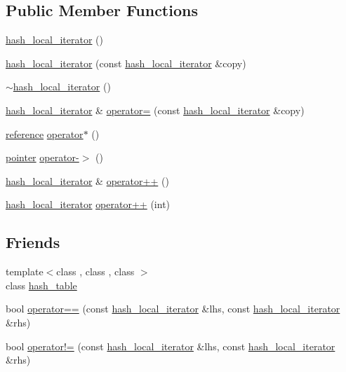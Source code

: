 \subsection*{Public Member Functions}
\begin{DoxyCompactItemize}
\item 
\hyperlink{classhash__const__local__iterator_a4f696dbd652463eff2a0694426810ffc}{hash\+\_\+local\+\_\+iterator} ()
\item 
\hyperlink{classhash__const__local__iterator_aa25e7f6e7190512c5e3ea83efb3f6c13}{hash\+\_\+local\+\_\+iterator} (const \hyperlink{classhash__local__iterator}{hash\+\_\+local\+\_\+iterator} \&copy)
\item 
\hyperlink{classhash__const__local__iterator_aaaa2de24d964d60ced25f38b52f594cd}{$\sim$hash\+\_\+local\+\_\+iterator} ()
\item 
\hyperlink{classhash__local__iterator}{hash\+\_\+local\+\_\+iterator} \& \hyperlink{classhash__const__local__iterator_ae564d42312230bbc12bf9306a5be11a7}{operator=} (const \hyperlink{classhash__local__iterator}{hash\+\_\+local\+\_\+iterator} \&copy)
\item 
\hyperlink{classhash__const__local__iterator_a651a8f3ade8e5024bc7819582c854f83}{reference} \hyperlink{classhash__const__local__iterator_a6f962677e98910597e58c4ed870a32cd}{operator$\ast$} ()
\item 
\hyperlink{classhash__const__local__iterator_acfcca3eb814a6062a2f3cdb62ebc94e4}{pointer} \hyperlink{classhash__const__local__iterator_a342db797fb8c5b5620da1e6e5dd8ca51}{operator-\/$>$} ()
\item 
\hyperlink{classhash__local__iterator}{hash\+\_\+local\+\_\+iterator} \& \hyperlink{classhash__const__local__iterator_a535769b06678a31762c600f7e76518d6}{operator++} ()
\item 
\hyperlink{classhash__local__iterator}{hash\+\_\+local\+\_\+iterator} \hyperlink{classhash__const__local__iterator_ab4f72c1d60c8de79822534e60ae7fa9c}{operator++} (int)
\end{DoxyCompactItemize}
\subsection*{Friends}
\begin{DoxyCompactItemize}
\item 
{\footnotesize template$<$class , class , class $>$ }\\class \hyperlink{classhash__const__local__iterator_a39f140c37d8ec7b0c08b23083c94562e}{hash\+\_\+table}
\item 
bool \hyperlink{classhash__const__local__iterator_a782c403295d166dc14d2350772adf50b}{operator==} (const \hyperlink{classhash__local__iterator}{hash\+\_\+local\+\_\+iterator} \&lhs, const \hyperlink{classhash__local__iterator}{hash\+\_\+local\+\_\+iterator} \&rhs)
\item 
bool \hyperlink{classhash__const__local__iterator_a59dc2e0a3828f0cb29ce36ef3b3d27dd}{operator!=} (const \hyperlink{classhash__local__iterator}{hash\+\_\+local\+\_\+iterator} \&lhs, const \hyperlink{classhash__local__iterator}{hash\+\_\+local\+\_\+iterator} \&rhs)
\end{DoxyCompactItemize}


